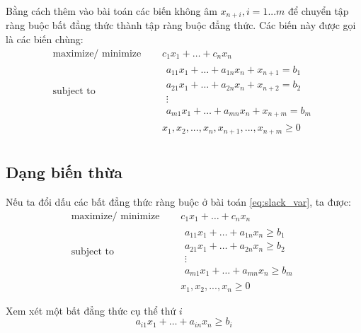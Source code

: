 Bằng cách thêm vào bài toán các biến không âm $x_{n+i}, i=1...m$ để chuyển tập ràng buộc bất đẳng thức thành tập ràng buộc đẳng thức. Các biến này được gọi là các biến chùng:
\begin{equation}
    \label{eq:slack_var1}
    \begin{aligned}
        \text{maximize/ minimize } \quad & c_1 x_1 + \dots + c_n x_n \\
        \text{subject to }\quad &
            \begin{array}{c}
            a_{11} x_1 + \dots + a_{1n} x_n + x_{n+1} = b_1 \\
            a_{21} x_1 + \dots + a_{2n} x_n + x_{n+2}= b_2 \\
            \vdots \\
            a_{m1} x_1 + \dots + a_{mn} x_n + x_{n+m} = b_m 
            \end{array} \\ 
            \quad & x_1, x_2, ..., x_n,  x_{n+1}, ..., x_{n+m}\geq 0 \\
    \end{aligned}   
\end{equation}

\subsection{Dạng biến thừa}

Nếu ta đổi dấu các bất đẳng thức ràng buộc ở bài toán \ref{eq:slack_var}, ta được:
\begin{equation}
    \label{eq:surplus_var}
    \begin{aligned}
        \text{maximize/ minimize } \quad & c_1 x_1 + \dots + c_n x_n \\
        \text{subject to }\quad &
            \begin{array}{c}
            a_{11} x_1 + \dots + a_{1n} x_n \geq b_1 \\
            a_{21} x_1 + \dots + a_{2n} x_n \geq b_2 \\
            \vdots \\
            a_{m1} x_1 + \dots + a_{mn} x_n \geq b_m 
            \end{array} \\ 
            & x_1, x_2, ..., x_n \geq 0
    \end{aligned}   
\end{equation}

Xem xét một bất đẳng thức cụ thể thứ $i$
\begin{equation}
    a_{i1} x_1 + \dots + a_{in} x_n \geq b_i
\end{equation}


